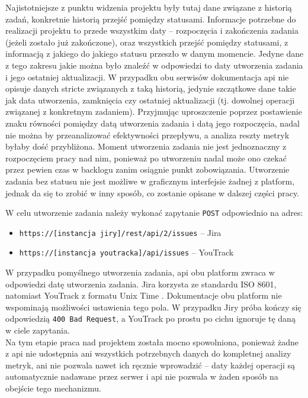 Najistotniejsze z punktu widzenia projektu były tutaj dane związane z historią zadań, konkretnie historią przejść pomiędzy statusami.
Informacje potrzebne do realizacji projektu to przede wszystkim daty -- rozpoczęcia i zakończenia zadania (jeżeli zostało już zakończone), oraz wszystkich przejść pomiędzy statusami, z informacją
z jakiego do jakiego statusu przeszło w danym momencie. Jedyne dane z tego zakresu jakie można było znaleźć w odpowiedzi to daty utworzenia zadania i jego ostatniej aktualizacji.
W przypadku obu serwisów dokumentacja api nie opisuje danych stricte związanych z taką historią, jedynie szczątkowe dane takie jak data utworzenia, zamknięcia czy ostatniej aktualizacji (tj. dowolnej operacji związanej z konkretnym zadaniem).
Przyjmując uproszczenie poprzez postawienie znaku równości pomiędzy datą utworzenia zadania i datą jego rozpoczęcia, nadal nie można by przeanalizować efektywności przepływu, a analiza reszty metryk byłaby dość przybliżona.
Moment utworzenia zadania nie jest jednoznaczny z rozpoczęciem pracy nad nim, ponieważ po utworzeniu nadal może ono czekać przez pewien czas w backlogu zanim osiągnie punkt zobowiązania.
Utworzenie zadania bez statusu nie jest możliwe w graficznym interfejsie żadnej z platform, jednak da się to zrobić w inny sposób, co zostanie opisane w dalszej części pracy.

W celu utworzenie zadania należy wykonać zapytanie \texttt{POST} odpowiednio na adres:
\begin{itemize}
    \item \texttt{https://[instancja jiry]/rest/api/2/issues} -- Jira
    \item \texttt{https://[instancja youtracka]/api/issues} -- YouTrack
\end{itemize}
W przypadku pomyślnego utworzenia zadania, api obu platform zwraca w odpowiedzi datę utworzenia zadania.
Jira korzysta ze standardu ISO 8601, natomiast YouTrack z formatu Unix Time \cite{UnixProgrammersManual}.
Dokumentacje obu platform nie wspominają możliwości ustawienia tego pola. W przypadku Jiry próba kończy się odpowiedzią \texttt{400 Bad Request}, a YouTrack po prostu po cichu ignoruje tę daną
w ciele zapytania.\\
Na tym etapie praca nad projektem została mocno spowolniona, ponieważ żadne z api nie udostępnia ani wszystkich potrzebnych danych do kompletnej analizy metryk, ani nie pozwala nawet ich ręcznie wprowadzić -- daty każdej operacji
są automatycznie nadawane przez serwer i api nie pozwala w żaden sposób na obejście tego mechanizmu.

